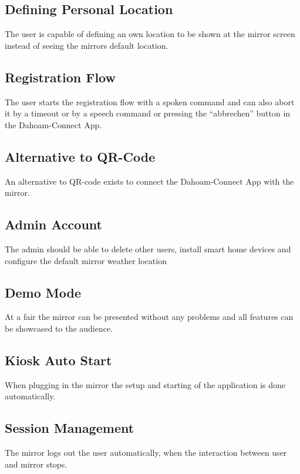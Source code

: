 \documentclass[12pt]{article}
\theoremstyle{definition}
\begin{document}
\subsection{Defining Personal Location}
The user is capable of defining an own location to be shown at the mirror screen instead of seeing the mirrors default location.
\subsection{Registration Flow}
The user starts the registration flow with a spoken command and can also abort it by a timeout or by a speech command or pressing the ``abbrechen'' button in the Dahoam-Connect App. 
\subsection{Alternative to QR-Code}
An alternative to QR-code exists to connect the Dahoam-Connect App with the mirror.
\subsection{Admin Account}
The admin should be able to delete other users, install smart home devices and configure the default mirror weather location
\subsection{Demo Mode}
At a fair the mirror can be presented without any problems and all features can be showcased to the audience.
\subsection{Kiosk Auto Start}
When plugging in the mirror the setup and starting of the application is done automatically.
\subsection{Session Management}
The mirror logs out the user automatically, when the interaction between user and mirror stops.
\end{document}
